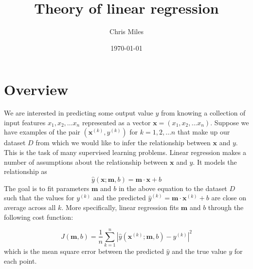 \documentclass{article}
\title{Theory of linear regression}
\date{\today}
\author{Chris Miles}
\renewcommand{\vec}[1]{
	\mathbf{#1}
}
\begin{document}
	
	\maketitle
	
	\section{Overview}
	We are interested in predicting some output value $y$ from knowing a collection of input features $x_1, x_2, \dots x_n$ represented as a vector $\vec{x}= (x_1, x_2, \dots x_n)$. Suppose we have examples of the pair $(\vec{x}^{(k)}, y^{(k)})$ for $k = 1, 2,  \dots n$ that make up our dataset $D$ from which we would like to infer the relationship between $\vec{x}$ and $y$. This is the task of many supervised learning problems. Linear regression makes a number of assumptions about the relationship between $\vec{x}$ and $y$. 
	It models the relationship as
	\[\hat{y}(\vec{x} ; \vec{m}, b) = \vec{m}\cdot\vec{x} + b\]
	The goal is to fit parameters $\vec{m}$ and $b$ in the above equation to the dataset $D$ such that the values for $y^{(k)}$ and the predicted $\hat{y}^{(k)} = \vec{m}\cdot\vec{x}^{(k)} + b$ are close on average across all $k$. More specifically, linear regression fits $\vec{m}$ and $b$ through the following cost function:
	
	\[J(\vec{m}, b) = \frac{1}{n}\sum_{k = 1}^{n}|\hat{y}(\vec{x}^{(k)}; \vec{m}, b) - y^{(k)}|^2\]
	 which is the mean square error between the predicted $\hat{y}$ and the true value $y$ for each point. 
	 
\end{document}
